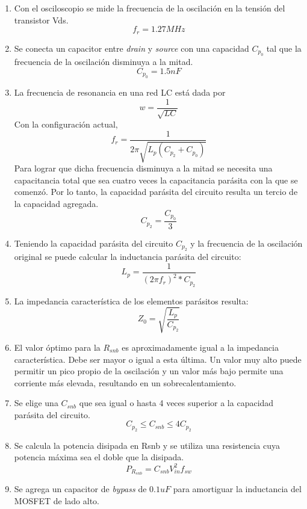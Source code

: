 \begin{enumerate}
    \item Con el osciloscopio se mide la frecuencia de la oscilación en la tensión del transistor Vds. 
    $$ f_{r}=1.27MHz $$ %
    \item Se conecta un capacitor entre \textit{drain} y \textit{source} con una capacidad $C_{p_{0}}$ tal que la frecuencia de la oscilación disminuya a la mitad. 
    $$ C_{p_{0}}=1.5nF $$
    \item La frecuencia de resonancia en una red LC está dada por
    $$ w=\frac{1}{\sqrt{LC}} $$
    Con la configuración actual, 
    $$ f_{r}=\frac{1}{2\pi\sqrt{L_{p}(C_{p_{2}}+C_{p_{0}})}} $$
    Para lograr que dicha frecuencia disminuya a la mitad se necesita una capacitancia total que sea cuatro veces la capacitancia parásita con la que se comenzó.
    Por lo tanto, la capacidad parásita del circuito resulta un tercio de la capacidad agregada. 
    $$ C_{p_{2}} = \frac{C_{p_{0}}}{3} $$
    \item Teniendo la capacidad parásita del circuito $C_{p_2}$ y la frecuencia de la oscilación original se puede calcular la inductancia parásita del circuito:
    $$ L_{p}=\frac{1}{(2\pi f_{r})^{2}*C_{p_{2}}} $$
    \item La impedancia característica de los elementos parásitos resulta:
    $$ Z_{0}=\sqrt{\frac{L_p}{C_{p_2}}} $$
    \item El valor óptimo para la $R_{snb}$ es aproximadamente igual a la impedancia característica. Debe ser mayor o igual a esta última. Un valor muy alto puede permitir un pico propio de la oscilación y un valor más bajo permite una corriente más elevada, resultando en un sobrecalentamiento.
    \item Se elige una $C_{snb}$ que sea igual o hasta 4 veces superior a la capacidad parásita del circuito. 
    $$ C_{p_2}\leq C_{snb}\leq 4C_{p_2} $$
    \item Se calcula la potencia disipada en Rsnb y se utiliza una resistencia cuya potencia máxima sea el doble que la disipada.
    $$ P_{R_{snb}}=C_{snb}V_{in}^2f_{sw} $$
    \item Se agrega un capacitor de \textit{bypass} de $0.1uF$ para amortiguar la inductancia del MOSFET de lado alto.     
\end{enumerate}